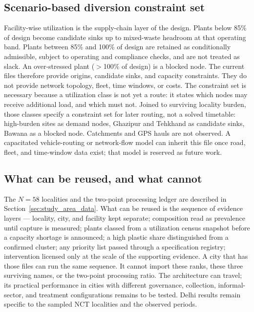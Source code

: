 \documentclass[12pt,a4paper]{article}
\begin{document}
\subsection{Scenario-based diversion constraint set}

Facility-wise utilization is the supply-chain layer of the design. Plants below 85\% of design become candidate sinks up to mixed-waste headroom at that operating band. Plants between 85\% and 100\% of design are retained as conditionally admissible, subject to operating and compliance checks, and are not treated as slack. An over-stressed plant ($>$100\% of design) is a blocked node. The current files therefore provide origins, candidate sinks, and capacity constraints. They do not provide network topology, fleet, time windows, or costs. The constraint set is necessary because a utilization class is not yet a route: it states which nodes may receive additional load, and which must not. Joined to surviving locality burden, those classes specify a constraint set for later routing, not a solved timetable: high-burden sites as demand nodes, Ghazipur and Tehkhand as candidate sinks, Bawana as a blocked node. Catchments and GPS hauls are not observed. A capacitated vehicle-routing or network-flow model can inherit this file once road, fleet, and time-window data exist; that model is reserved as future work.

\subsection{What can be reused, and what cannot}
\label{sec:transfer}

The $N=58$ localities and the two-point processing ledger are described in Section~\ref{sec:study_area_data}. What can be reused is the sequence of evidence layers --- locality, city, and facility kept separate; composition read as prevalence until capture is measured; plants classed from a utilization census snapshot before a capacity shortage is announced; a high plastic share distinguished from a confirmed cluster; any priority list passed through a specification registry; intervention licensed only at the scale of the supporting evidence. A city that has those files can run the same sequence. It cannot import these ranks, these three surviving names, or the two-point processing ratio. The architecture can travel; its practical performance in cities with different governance, collection, informal-sector, and treatment configurations remains to be tested. Delhi results remain specific to the sampled NCT localities and the observed periods.
\end{document}
